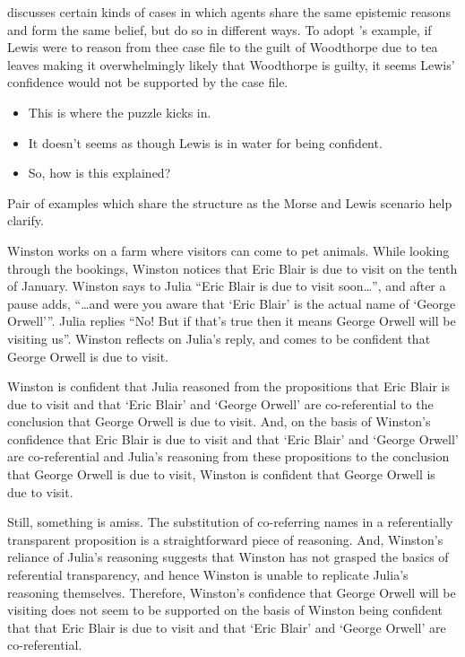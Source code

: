 \documentclass[10pt]{article}
\begin{document}
\textcite{Turri:2010aa} discusses certain kinds of cases in which agents share the same {\color{red} epistemic reasons} and form the same belief, but do so in different ways.
To adopt \citeauthor{Turri:2010aa}'s example, if Lewis were to reason from thee case file to the guilt of Woodthorpe due to tea leaves making it overwhelmingly likely that Woodthorpe is guilty, it seems Lewis' confidence would not be supported by the case file.

\begin{itemize}
\item This is where the puzzle kicks in.
\item It doesn't seems as though Lewis is in water for being confident.
\item So, how is this explained?
\end{itemize}

Pair of examples which share the structure as the Morse and Lewis scenario help clarify.

\begin{scenario}
  Winston works on a farm where visitors can come to pet animals.
  While looking through the bookings, Winston notices that Eric Blair is due to visit on the tenth of January.
  Winston says to Julia ``Eric Blair is due to visit soon\dots'', and after a pause adds, ``\dots and were you aware that `Eric Blair' is the actual name of `George Orwell'''.
  Julia replies ``No! But if that's true then it means George Orwell will be visiting us''.
  Winston reflects on Julia's reply, and comes to be confident that George Orwell is due to visit.
\end{scenario}

Winston is confident that Julia reasoned from the propositions that Eric Blair is due to visit and that `Eric Blair' and `George Orwell' are co-referential to the conclusion that George Orwell is due to visit.
And, on the basis of Winston's confidence that Eric Blair is due to visit and that `Eric Blair' and `George Orwell' are co-referential and Julia's reasoning from these propositions to the conclusion that George Orwell is due to visit, Winston is confident that George Orwell is due to visit.

Still, something is amiss.
The substitution of co-referring names in a referentially transparent proposition is a straightforward piece of reasoning.
And, Winston's reliance of Julia's reasoning suggests that Winston has not grasped the basics of referential transparency, and hence Winston is unable to replicate Julia's reasoning themselves.
Therefore, Winston's confidence that George Orwell will be visiting does not seem to be supported on the basis of Winston being confident that that Eric Blair is due to visit and that `Eric Blair' and `George Orwell' are co-referential.
\end{document}
